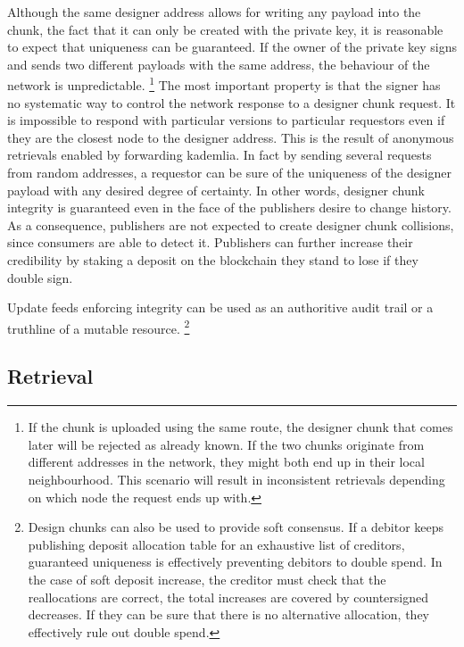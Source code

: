\documentclass[a4paper,10pt,fullpage]{article}
\numberwithin{equation}{section}
\theoremstyle{definition}
\begin{document}
Although the same designer address allows for writing any payload into the chunk, the fact that it can only be created with the private key, it is reasonable to expect that uniqueness can be guaranteed. If the owner of the private key signs and sends two different payloads with the same address, the behaviour of the network is unpredictable.%
%
\footnote{If the chunk is uploaded using the same route, the designer chunk that comes later will be rejected as already known. If the two chunks originate from different addresses in the network, they might both end up in their local neighbourhood. This scenario will result in inconsistent retrievals depending on which node the request ends up with.}
%
The most important property is that the signer has no systematic way to control the network response to a designer chunk request. It is impossible to respond with particular versions to particular requestors even if they are the closest node to the designer address. This is the result of anonymous retrievals enabled by forwarding kademlia. In fact by sending several requests from random addresses, a requestor can be sure of the uniqueness of the designer payload with any desired degree of certainty. In other words, designer chunk integrity is guaranteed even in the face of the publishers desire to change history.
As a consequence, publishers are not expected to create designer chunk collisions, since consumers are able to detect it.  
Publishers can further increase their credibility by staking a deposit on the blockchain they stand to  lose if they double sign.



\begin{figure}[htbp]
   \centering
   \caption{}
   \label{fig:designchunk-integrity}
\end{figure}

Update feeds enforcing integrity can be used as an authoritive audit trail or a truthline of a   mutable resource.%
%
\footnote{Design chunks can also be used to provide soft consensus. If a debitor keeps publishing deposit allocation table for an exhaustive list of creditors, guaranteed uniqueness is effectively preventing debitors to double spend. In the case of soft deposit increase, the creditor must check that the reallocations are correct, the total increases are covered by countersigned decreases. If they can be sure that there is no alternative allocation, they effectively rule out double spend.}



\subsection{Retrieval}
\end{document}
